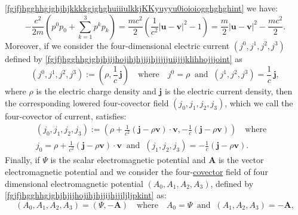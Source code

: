 \documentclass{article}
\theoremstyle{definition}
\theoremstyle{remark}
\renewcommand{\vec}[1]{\mathbf{#1}}
\newcommand{\er}{\eqref}
\newcommand{\er}{\eqref}
\begin{document}
\er{fgjfjhgghhgjghjhjkkkkgjghghuiiiulkkjKKyuyyu0ioioiogghghghint} we
have:
\begin{equation}\label{fgjfjhgghhgjghjhjkkkkgjghghuiiiulkkjKKyuyyu0ioioiogghghghgghghint}
-\frac{c^2}{2m}\left(p^0p_0+\sum_{k=1}^{3}p^kp_k\right)=\frac{mc^2}{2}\left(\frac{1}{c^2}\left|\vec
u-\vec v\right|^2-1\right)=\frac{m}{2}\left|\vec u-\vec
v\right|^2-\frac{mc^2}{2}.
\end{equation}
Moreover, if we consider the  four-dimensional electric current
$(j^0,j^1,j^2,j^3)$ defined by
\er{fgjfjhgghhgjghjhjijhojihjhjjijhjjjjjuiijjjklihhojjjoint} as
\begin{equation}\label{fgjfjhgghhgjghjhjijhojihjhjjijhjjjjjuiijjjklihhojjjokjkjint}
(j^0,j^1,j^2,j^3):=\left(\rho,\frac{1}{c}\,\vec
j\right)\quad\text{where}\quad
j^0=\rho\;\;\text{and}\;\;(j^1,j^2,j^3)=\frac{1}{c}\,\vec j,
\end{equation}
where $\rho$ is the electric charge density and $\vec j$ is the
electric current density, then the corresponding lowered
four-covector field $(j_0,j_1,j_2,j_3)$, which we call the
four-covector of current, satisfies:
\begin{multline}\label{fgjfjhgghhgjghjhjijhojihjhjjijhjjjjjuiikkjjnjjbjhjhiyuyugint}
(j_0,j_1,j_2,j_3):=\left(\rho+\frac{1}{c^2}\left(\vec j-\rho\vec
v\right)\cdot\vec v,-\frac{1}{c}\left(\vec j-\rho\vec
v\right)\right)\quad\text{where}\quad\\
j_0=\rho+\frac{1}{c^2}\left(\vec j-\rho\vec v\right)\cdot\vec
v\;\;\text{and}\;\;(j_1,j_2,j_3)=-\frac{1}{c}\left(\vec j-\rho\vec
v\right).
\end{multline}
Finally, if $\Psi$ is the scalar electromagnetic potential and $\vec
A$ is the vector electromagnetic potential and we consider the
four-\underline{covector} field of four dimensional electromagnetic
potential $(A_0,A_1,A_2,A_3)$, defined by
\er{fgjfjhgghhgjghjhjijhojihjhjjijhjjjljljpkint} as:
\begin{equation}\label{fgjfjhgghhgjghjhjijhojihjhjjijhjjjljljpkikhjint}
(A_0,A_1,A_2,A_3)=(\Psi,-\vec A)\quad\text{where}\quad
A_0=\Psi\;\;\text{and}\;\;(A_1,A_2,A_3)=-\vec A,
\end{equation}
\end{document}
